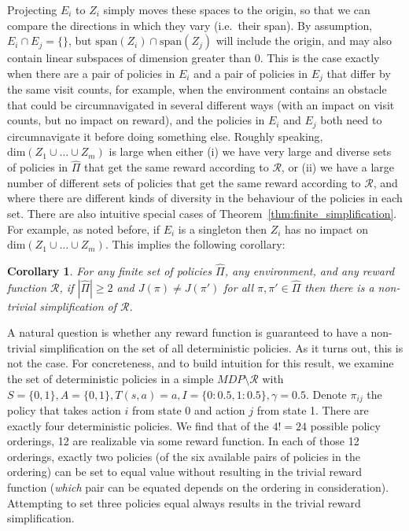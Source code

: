 \documentclass{article}
\newtheorem{corollary}{Corollary}
\theoremstyle{definition}
\theoremstyle{remark}
\begin{document}
Projecting $E_i$ to $Z_i$ simply moves these spaces to the origin, so that we can compare the directions in which they vary (i.e.\ their span).
By assumption, $E_i \cap E_j = \{\}$, but $\mathrm{span}(Z_i) \cap \mathrm{span}(Z_j)$ will include the origin, and may also contain linear subspaces of dimension greater than 0.
This is the case exactly when there are a pair of policies in $E_i$ and a pair of policies in $E_j$ that differ by the same visit counts,
for example, when the environment contains an obstacle that could be circumnavigated in several different ways (with an impact on visit counts, but no impact on reward), and the policies in $E_i$ and $E_j$ both need to circumnavigate it before doing something else. 
Roughly speaking, $\mathrm{dim}(Z_1 \cup \dots \cup Z_m)$ is large when either (i) we have very large and diverse sets of policies in $\hat{\Pi}$ that get the same reward according to $\mathcal{R}$, or (ii) we have a large number of different sets of policies that get the same reward according to $\mathcal{R}$, and where there are different kinds of diversity in the behaviour of the policies in each set.
There are also intuitive special cases of Theorem~\ref{thm:finite_simplification}. For example, as noted before, if $E_i$ is a singleton then $Z_i$ has no impact on $\mathrm{dim}(Z_1 \cup \dots \cup Z_m)$. This implies the following corollary:








\begin{corollary}
For any finite set of policies $\hat{\Pi}$, any environment, and any reward function $\mathcal{R}$, if $|\hat{\Pi}| \geq 2$ and $J(\pi) \neq J(\pi')$ for all $\pi,\pi' \in \hat{\Pi}$ then there is a non-trivial simplification of $\mathcal{R}$.
\end{corollary}



A natural question is whether any reward function is guaranteed to have a non-trivial simplification on the set of all deterministic policies.
As it turns out, this is not the case.
For concreteness, and to build intuition for this result, we examine the set of deterministic policies in a simple $MDP\setminus \mathcal{R}$ with $S = \{0, 1\}, A = \{0, 1\}, T(s, a) = a, I = \{0: 0.5, 1: 0.5 \}, \gamma = 0.5$. Denote $\pi_{ij}$ the policy that takes action $i$ from state 0 and action $j$ from state 1. There are exactly four deterministic policies.
We find that of the $4! = 24$ possible policy orderings, 12 are realizable via some reward function. In each of those 12 orderings, exactly two policies (of the six available pairs of policies in the ordering) can be set to equal value without resulting in the trivial reward function (\textit{which} pair can be equated depends on the ordering in consideration). Attempting to set three policies equal always results in the trivial reward simplification.
\end{document}
